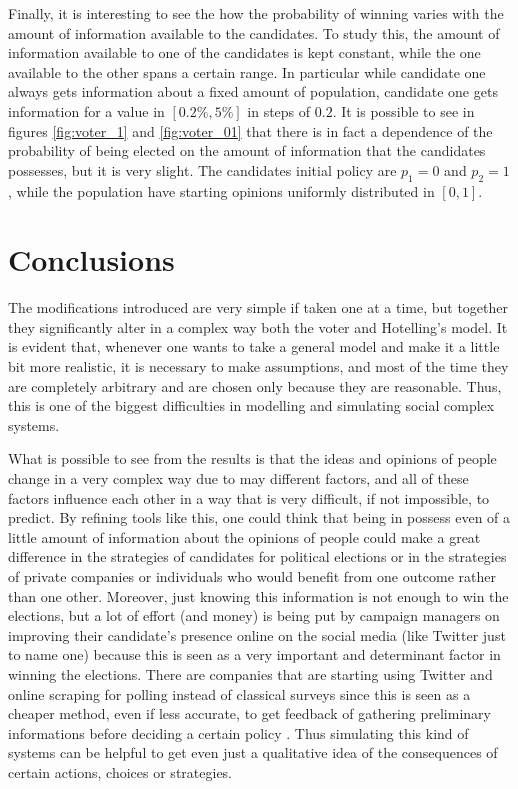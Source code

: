 \documentclass[11pt,a4paper,twocolumn]{article}
\begin{document}
Finally, it is interesting to see the how the probability of winning varies with the amount of information available to the candidates. To study this, the amount of information available to one of the candidates is kept constant, while the one available to the other spans a certain range. In particular while candidate one always gets information about a fixed amount of population, candidate one gets information for a value in $[0.2\%,5\%]$ in steps of $0.2$. It is possible to see in figures \ref{fig:voter_1} and \ref{fig:voter_01} that there is in fact a dependence of the probability of being elected on the amount of information that the candidates possesses, but it is very slight. The candidates initial policy are $p_1=0$ and $p_2=1$, while the population have starting opinions uniformly distributed in $[0,1]$.

\vspace{-15pt}
\section{Conclusions}
\vspace{-10pt}
The modifications introduced are very simple if taken one at a time, but together they significantly alter in a complex way both the voter and Hotelling's model.
It is evident that, whenever one wants to take a general model and make it a little bit more realistic, it is necessary to make assumptions, and most of the time they are completely arbitrary and are chosen only because they are reasonable. Thus, this is one of the biggest difficulties in modelling and simulating social complex systems.

What is possible to see from the results is that the ideas and opinions of people change in a very complex way due to may different factors, and all of these factors influence each other in a way that is very difficult, if not impossible, to predict.
By refining tools like this, one could think that being in possess even of a little amount of information about the opinions of people could make a great difference in the strategies of candidates for political elections or in the strategies of private companies or individuals who would benefit from one outcome rather than one other. Moreover, just knowing this information is not enough to win the elections, but a lot of effort (and money) is being put by campaign managers on improving their candidate's presence online on the social media (like Twitter just to name one) because this is seen as a very important and determinant factor in winning the elections.
There are companies that are starting using Twitter and online scraping for polling instead of classical surveys since this is seen as a cheaper method, even if less accurate, to get feedback of gathering preliminary informations before deciding a certain policy \citep{influence}.
Thus simulating this kind of systems can be helpful to get even just a qualitative idea of the consequences of certain actions, choices or strategies.
\end{document}
